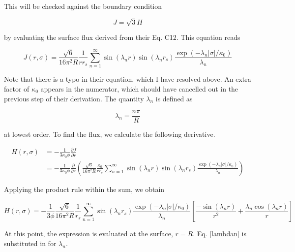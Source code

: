 \documentclass[onecolumn]{aastex63}
\begin{document}
This will be checked against the boundary condition

\begin{equation} \label{bc}
    J = \sqrt{3} H
\end{equation}

by evaluating the surface flux derived from their Eq. C12. This equation reads 

\begin{equation} \label{c12}
    J(r, \sigma) = \frac{\sqrt{6}}{16 \pi^2 R} \frac{1}{rr_s} \sum_{n=1}^{\infty}\sin(\lambda_n r) \sin(\lambda_n r_s) \frac{\exp{(-\lambda_n |\sigma|/\kappa_0)}}{\lambda_n}
\end{equation}

Note that there is a typo in their equation, which I have resolved above. An extra factor of $\kappa_0$ appears in the numerator, which should have cancelled out in the previous step of their derivation. The quantity $\lambda_n$ is defined as 

\begin{equation} \label{lambdan}
    \lambda_n = \frac{n\pi}{R}
\end{equation}

at lowest order. To find the flux, we calculate the following derivative.

\begin{equation}
    \begin{split}
    H(r, \sigma) &= - \frac{1}{3\kappa_0 \phi}\frac{\partial J}{\partial r}\\
    &= - \frac{1}{3\kappa_0 \phi}\frac{\partial}{\partial r}\left(\frac{\sqrt{6}}{16 \pi^2 R} \frac{\kappa_0}{rr_s} \sum_{n=1}^{\infty}\sin(\lambda_n r) \sin(\lambda_n r_s) \frac{\exp{(-\lambda_n |\sigma|/\kappa_0)}}{\lambda_n}\right)
    \end{split}
\end{equation}

Applying the product rule within the sum, we obtain

\begin{equation}
    H(r, \sigma) = - \frac{1}{3 \phi} \frac{\sqrt{6}}{16 \pi^2 R} \frac{1}{r_s} \sum_{n=1}^{\infty} \sin(\lambda_n r_s) \frac{\exp{(-\lambda_n |\sigma|/\kappa_0)}}{\lambda_n} \left[ \frac{-\sin(\lambda_n r)}{r^2} + \frac{\lambda_n \cos(\lambda_n r)}{r}\right]
\end{equation}

At this point, the expression is evaluated at the surface, $r=R$. Eq. \ref{lambdan} is substituted in for $\lambda_n$.
\end{document}
